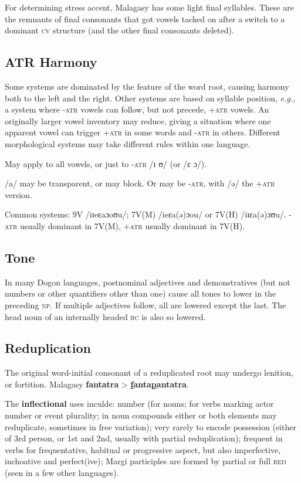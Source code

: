 \documentclass[11pt]{article}
\newcommand{\LL}[1]{\textbf{#1}}  %
\newcommand{\I}[1]{\textsc{#1}}   %
\begin{document}
For determining stress accent, Malagasy has some light final
syllables. These are the remnants of final consonants that got vowels
tacked on after a switch to a dominant \I{cv} structure (and the other
final consonants deleted).

\subsection{ATR Harmony}
Some systems are dominated by the feature of the word root, causing
harmony both to the left and the right. Other systems are based on
syllable position, \textit{e.g.,} a system where \I{-atr} vowels can
follow, but not precede, \I{+atr} vowels. An originally larger vowel
inventory may reduce, giving a situation where one apparent vowel can
trigger \I{+atr} in some words and \I{-atr} in others. Different
morphological systems may take different rules within one language.

May apply to all vowels, or just to \I{-atr} /ɪ ʊ/ (or /ɛ ɔ/).

/a/ may be transparent, or may block. Or may be \I{-atr}, with /ə/ the
\I{+atr} version.

Common systems: 9V /iɪeɛaɔoʊu/; 7V(M) /ieɛa(ə)ɔou/ or 7V(H)
/iɪɛa(ə)ɔʊu/. \I{-atr} usually dominant in 7V(M), \I{+atr} usually
dominant in 7V(H).

\subsection{Tone}
In many Dogon languages, postnominal adjectives and demonstratives
(but not numbers or other quantifiers other than one) cause all tones
to lower in the preceding \I{np}.  If multiple adjectives follow, all
are lowered except the last. The head noun of an internally headed
\I{rc} is also so lowered.

\subsection{Reduplication} The original word-initial consonant of a
reduplicated root may undergo lenition, or fortition.  Malagasy
\LL{fantatra} > \LL{\uline{f}anta\uline{p}antatra}.

The \textbf{inflectional} uses inculde: number (for nouns; for verbs
marking actor number or event plurality; in noun compounds either or
both elements may reduplicate, sometimes in free variation); very
rarely to encode possession (either of 3rd person, or 1st and 2nd,
usually with partial reduplication); frequent in verbs for
frequentative, habitual or progressive aspect, but also imperfective,
inchoative and perfect(ive); Margi participles are formed by partial
or full \I{red} (seen in a few other languages).
\end{document}
